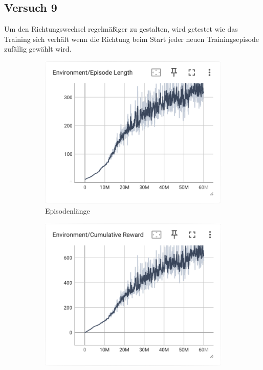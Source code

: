 \subsection{Versuch 9}
Um den Richtungswechsel regelmäßiger zu gestalten, wird getestet wie das Training sich verhält wenn die Richtung beim Start jeder neuen Trainingsepisode zufällig gewählt wird.

\begin{figure}[H]
  \centering  
  \begin{subfigure}{.49\textwidth}
      \centering  
      \includegraphics[width=\textwidth]{img/135_episode_length}
      \caption{Episodenlänge}
      \label{fig:135_episode_length}
    \end{subfigure}
    \begin{subfigure}{.49\textwidth}
      \centering  
      \includegraphics[width=\textwidth]{img/135_cumulative_reward}

\end{subfigure}
\end{figure}
